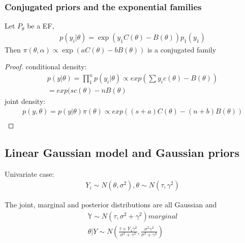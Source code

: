 \subsubsection*{Conjugated priors and the exponential families}



\begin{theorem}
	Let $P_\theta$ be a EF, 
	\begin{align*}
		p(y_i|\theta) = \exp(y_1 C(\theta) - B(\theta)) p_1(y_1)
	\end{align*}
	Then $\pi(\theta, \alpha) \propto \exp(a C(\theta) - b B(\theta))$ is a conjugated family
\end{theorem}
\begin{proof}
	conditional density:
	\begin{align*}
		p(y|\theta) = \prod_1^n p(y_i|\theta) \propto exp(\sum y_i c(\theta) - B(\theta))\\
		= exp(sc(\theta) - nB(\theta)
	\end{align*}
	joint density:
	\begin{align*}
		p(y, \theta) = p(y|\theta) \pi(\theta) \propto exp((s+a)C(\theta) - (n+b)B(\theta))\\
	\end{align*}
\end{proof}

\subsection{Linear Gaussian model and Gaussian priors}

Univariate case:
\begin{align*}
	Y_i \sim N(\theta, \sigma^2), \theta \sim N(\tau, \gamma^2)
\end{align*}

\begin{theorem}
	The joint, marginal and posterior distributions are all Gaussian and 
	\begin{align*}
		\mathbb{Y} \sim N(\tau, \sigma^2 + \gamma^2) marginal\\
		\theta|Y \sim N(\frac{\tau + Y_1 \gamma^2}{\sigma^2 + \gamma^2}, \frac{\sigma^2 \gamma^2}{\sigma^2 + \gamma^2})
	\end{align*}
\end{theorem}

